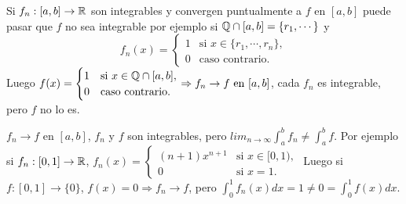 \begin{note}
  Si $f_n: [a, b] \to \mathbb{R}$ son integrables y convergen puntualmente a $f$ en $[a, b]$ puede pasar que $f$ no sea integrable por ejemplo si $\mathbb{Q} \cap [a, b] = \{r_1, \cdots\}$ y 
  \begin{equation}
    f_n(x) = \begin{cases}
      1 & \text{si } x \in \{r_1, \cdots, r_n\}, \\
      0 & \text{caso contrario}.
    \end{cases}
  \end{equation}
  Luego $f(x) = \begin{cases}
    1 & \text{si } x \in \mathbb{Q} \cap [a, b], \\
    0 & \text{caso contrario}.
  \end{cases} \Rightarrow f_n \to f \text{ en } [a, b]$, cada $f_n$ es integrable, pero $f$ no lo es.
\end{note}

\begin{note}
  $f_n \to f$ en $[a, b]$, $f_n$ y $f$ son integrables, pero $lim_{n \to \infty} \int_a^b f_n \neq \int_a^b f$. Por ejemplo si $f_n: [0, 1] \to \mathbb{R}$, $f_n(x) = \begin{cases}
    (n+1) x^{n+1} & \text{si } x \in [0, 1), \\
    0 & \text{si } x = 1.
  \end{cases}$ Luego si $f: [0, 1] \to \{0\}$, $f(x) = 0 \Rightarrow f_n \to f$, pero $\int_0^1 f_n(x) dx = 1 \neq 0 = \int_0^1 f(x) dx$. 
\end{note}
